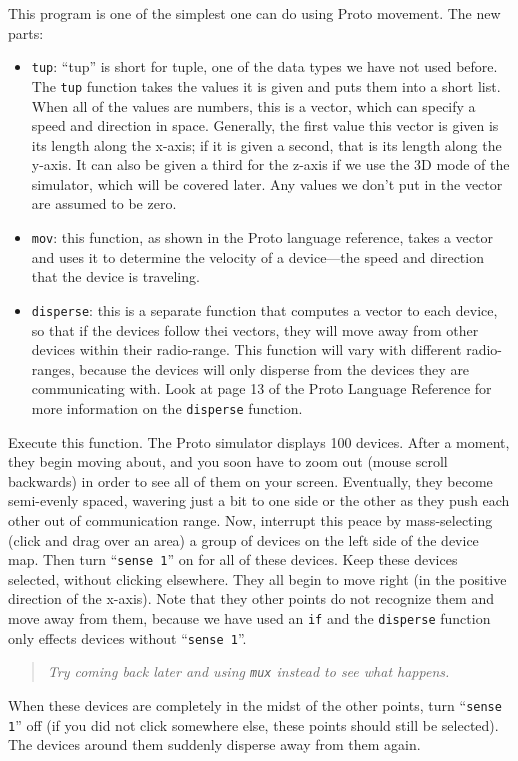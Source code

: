 \documentclass{article}
\newcommand\problem[1]{\begin{quote}{\em #1}\end{quote}}
\newcommand\var[1]{{\tt #1}}
\newcommand\qvar[1]{``{\tt #1}''}
\begin{document}
This program is one of the simplest one can do using Proto
movement. The new parts:
\begin{itemize}
\item \var{tup}: ``tup'' is short for tuple, one of the data types we
  have not used before.  The \var{tup} function takes the values it is
  given and puts them into a short list.  When all of the values are
  numbers, this is a vector, which can specify a speed and
  direction in space.  Generally, the first value this vector is given
  is its length along the x-axis; if it is given a second, that is its
  length along the y-axis.  It can also be given a third for the
  z-axis if we use the 3D mode of the simulator, which will be covered
  later.  Any values we don't put in the vector are assumed to be
  zero.
\item \var{mov}: this function, as shown in the Proto language
  reference, takes a vector and uses it to determine the velocity of a
  device---the speed and direction that the device is traveling.
\item \var{disperse}: this is a separate function that computes a
  vector to each device, so that if the devices follow thei vectors,
  they will move away from other devices within their radio-range.
  This function will vary with different radio-ranges, because the
  devices will only disperse from the devices they are communicating
  with.  Look at page 13 of the Proto Language Reference for more
  information on the \var{disperse} function.
\end{itemize}

Execute this function.  The Proto simulator displays 100 devices.
After a moment, they begin moving about, and you soon have to zoom out
(mouse scroll backwards) in order to see all of them on your screen.
Eventually, they become semi-evenly spaced, wavering just a bit to one
side or the other as they push each other out of communication range.
Now, interrupt this peace by mass-selecting (click and drag over an
area) a group of devices on the left side of the device map.  Then
turn \qvar{sense 1} on for all of these devices.  Keep these devices
selected, without clicking elsewhere.  They all begin to move right
(in the positive direction of the x-axis).  Note that they other
points do not recognize them and move away from them, because we have
used an \var{if} and the \var{disperse} function only effects devices
without \qvar{sense 1}.  \problem{Try coming back later and using \var{mux}
instead to see what happens.}

When these devices are completely in the midst of the other points,
turn \qvar{sense 1} off (if you did not click somewhere else, these
points should still be selected).  The devices around them suddenly
disperse away from them again.
\end{document}
